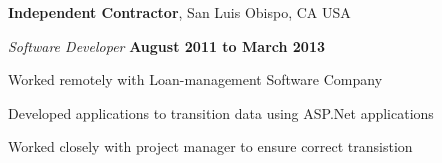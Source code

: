 \documentclass[10pt]{article}
\begin{document}
\halfblankline


{\textbf{Independent Contractor}}, San Luis Obispo, CA USA
\begin{outerlist}
\item[] \textit{Software Developer}%
    \hfill \textbf{August 2011 to March 2013}
    \begin{innerlist}%
    \item Worked remotely with Loan-management Software Company
    \item Developed applications to transition data using ASP.Net applications
    \item Worked closely with project manager to ensure correct transistion
\end{innerlist}

\end{outerlist}

\halfblankline
\end{document}
